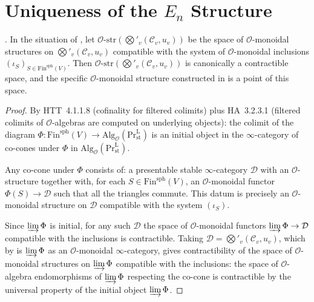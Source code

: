 \section{Uniqueness of the \(E_{n}\) Structure}
\label{v4-arith:tate:uniqueness}

\begin{proposition}
\label{v4-arith:tate:prop:uniqueness}
\ClaimStatusProvedHere. In the situation of
, let
\(\mathcal{O}\)-\(\mathrm{str}(\bigotimes'_{v}(\mathcal{C}_{v},u_{v}))\)
be the space of \(\mathcal{O}\)-monoidal structures on
\(\bigotimes'_{v}(\mathcal{C}_{v},u_{v})\) compatible with the
system of \(\mathcal{O}\)-monoidal inclusions
\((\iota_{S})_{S\in\mathrm{Fin}^{\mathrm{sph}}(V)}\). Then
\(\mathcal{O}\)-\(\mathrm{str}(\bigotimes'_{v}(\mathcal{C}_{v},u_{v}))\)
is canonically a contractible space, and the specific
\(\mathcal{O}\)-monoidal structure constructed in
 is a point of this space.
\end{proposition}

\begin{proof}
By HTT~4.1.1.8 (cofinality for filtered colimits) plus
HA~3.2.3.1 (filtered colimits of \(\mathcal{O}\)-algebras are computed
on underlying objects): the colimit of the diagram
\(\Phi:\mathrm{Fin}^{\mathrm{sph}}(V)\to\mathrm{Alg}_{\mathcal{O}}(\mathrm{Pr}^{\mathrm{L}}_{\mathrm{st}})\)
is an initial object in the \(\infty\)-category of co-cones under
\(\Phi\) in \(\mathrm{Alg}_{\mathcal{O}}(\mathrm{Pr}^{\mathrm{L}}_{\mathrm{st}})\).

Any co-cone under \(\Phi\) consists of: a presentable stable
\(\infty\)-category \(\mathcal{D}\) with an \(\mathcal{O}\)-structure
together with, for each \(S\in\mathrm{Fin}^{\mathrm{sph}}(V)\), an
\(\mathcal{O}\)-monoidal functor \(\Phi(S)\to\mathcal{D}\) such that all
the triangles commute. This datum is precisely an
\(\mathcal{O}\)-monoidal structure on \(\mathcal{D}\) compatible with
the system \((\iota_{S})\).

Since \(\varinjlim\Phi\) is initial, for any such \(\mathcal{D}\) the
space of \(\mathcal{O}\)-monoidal functors
\(\varinjlim\Phi\to\mathcal{D}\) compatible with the inclusions is
contractible. Taking \(\mathcal{D}=\bigotimes'_{v}(\mathcal{C}_{v},u_{v})\),
which by  is
\(\varinjlim\Phi\) as an \(\mathcal{O}\)-monoidal \(\infty\)-category,
gives contractibility of the space of \(\mathcal{O}\)-monoidal structures
on \(\varinjlim\Phi\) compatible with the inclusions: the space of
\(\mathcal{O}\)-algebra endomorphisms of \(\varinjlim\Phi\) respecting
the co-cone is contractible by the universal property of the initial
object \(\varinjlim\Phi\).
\end{proof}

